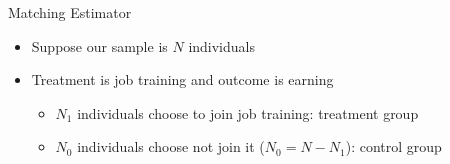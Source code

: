 \documentclass[hyperref={pdfpagelabels=false}]{beamer}
\begin{document}
\begin{frame}{Matching Estimator}
\begin{itemize}
	
	
\item Suppose our sample is $N$ individuals
\vspace{0.3cm}
\item Treatment is job training and outcome is earning
\vspace{0.3cm}
\begin{itemize}
	\item $N_1$ individuals choose to join job training: treatment group
	\vspace{0.3cm}
	\item $N_0$ individuals choose not join it ($N_0=N-N_1$): control group
\end{itemize}

	

\end{itemize}
\end{frame}
\end{document}
